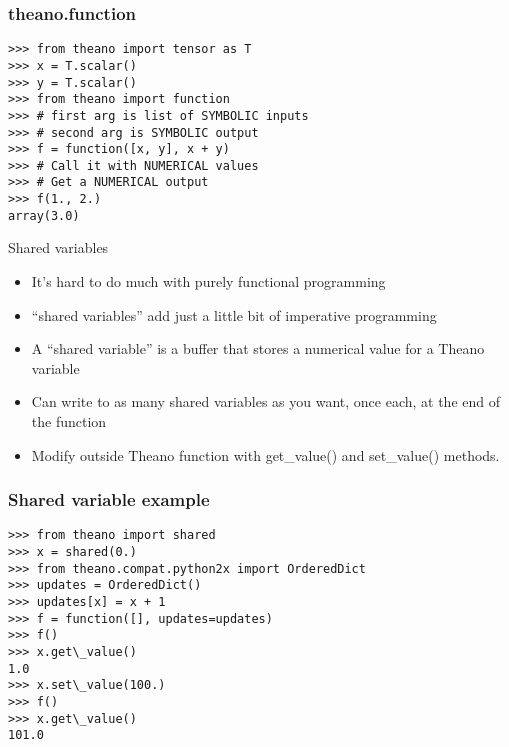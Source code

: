 \documentclass[utf8x,xcolor=pdftex,dvipsnames,table]{beamer}
\begin{document}
\begin{frame}[fragile]
  \frametitle{theano.function}

\begin{lstlisting}
>>> from theano import tensor as T
>>> x = T.scalar()
>>> y = T.scalar()
>>> from theano import function
>>> # first arg is list of SYMBOLIC inputs
>>> # second arg is SYMBOLIC output
>>> f = function([x, y], x + y)
>>> # Call it with NUMERICAL values
>>> # Get a NUMERICAL output
>>> f(1., 2.)
array(3.0)
\end{lstlisting}
\end{frame}

\begin{frame}{Shared variables}
  \begin{itemize}
  \item It’s hard to do much with purely functional programming
  \item ``shared variables'' add just a little bit of imperative programming
  \item A “shared variable” is a buffer that stores a numerical value for a Theano variable
  \item Can write to as many shared variables as you want, once each, at the end of the function
  \item  Modify outside Theano function with get\_value() and set\_value() methods.
  \end{itemize}
\end{frame}

\begin{frame}[fragile]
  \frametitle{Shared variable example}

\begin{lstlisting}
>>> from theano import shared
>>> x = shared(0.)
>>> from theano.compat.python2x import OrderedDict
>>> updates = OrderedDict()
>>> updates[x] = x + 1
>>> f = function([], updates=updates)
>>> f()
>>> x.get\_value()
1.0
>>> x.set\_value(100.)
>>> f()
>>> x.get\_value()
101.0
\end{lstlisting}
\end{frame}
\end{document}
